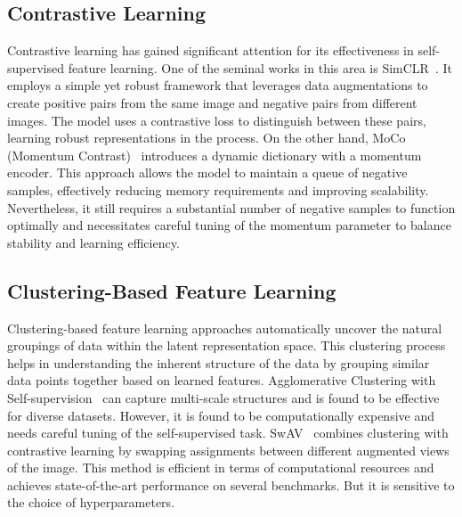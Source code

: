 \subsection{Contrastive Learning}
Contrastive learning has gained significant attention for its effectiveness in self-supervised feature learning. One of the seminal works in this area is SimCLR~\cite{chen2020simple}. It employs a simple yet robust framework that leverages data augmentations to create positive pairs from the same image and negative pairs from different images. The model uses a contrastive loss to distinguish between these pairs, learning robust representations in the process. On the other hand, MoCo (Momentum Contrast)~\cite{he2020momentum} introduces a dynamic dictionary with a momentum encoder. This approach allows the model to maintain a queue of negative samples, effectively reducing memory requirements and improving scalability. Nevertheless, it still requires a substantial number of negative samples to function optimally and necessitates careful tuning of the momentum parameter to balance stability and learning efficiency.

\subsection{Clustering-Based Feature Learning}
Clustering-based feature learning approaches automatically uncover the natural groupings of data within the latent representation space. This clustering process helps in understanding the inherent structure of the data by grouping similar data points together based on learned features. Agglomerative Clustering with Self-supervision~\cite{asano2020selflabelling} can capture multi-scale structures and is found to be effective for diverse datasets. However, it is found to be computationally expensive and needs careful tuning of the self-supervised task. SwAV~\cite{caron2021unsupervised} combines clustering with contrastive learning by swapping assignments between different augmented views of the image. This method is efficient in terms of computational resources and achieves state-of-the-art performance on several benchmarks. But it is sensitive to the choice of hyperparameters.

